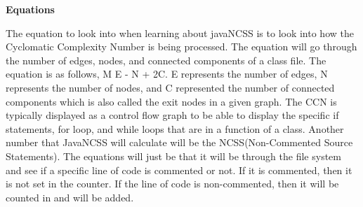\documentclass{article}
\begin{document}
\begin{center}
\textbf{Equations}
\end{center}
The equation to look into when learning about javaNCSS is to look into how the Cyclomatic Complexity Number is being processed. The equation will go through the number of edges, nodes, and connected components of a class file. The equation is as follows, M E - N + 2C. E represents the number of edges, N represents the number of nodes, and  C represented the number of connected components which is also called the exit nodes in a given graph. The CCN is typically displayed as a control flow graph to be able to display the specific if statements, for loop, and while loops that are in a function of a class. Another number that JavaNCSS will calculate will be the NCSS(Non-Commented Source Statements). The equations will just be that it will be through the file system and see if a specific line of code is commented or not. If it is commented, then it is not set in the counter. If the line of code is non-commented, then it will be counted in and will be added.

   
\end{document}
